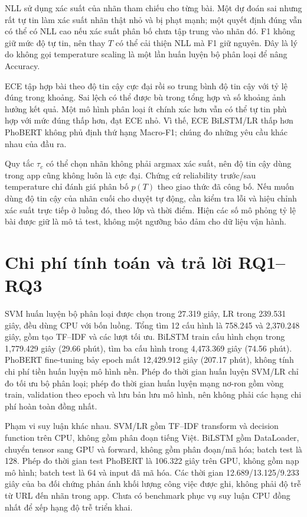 NLL sử dụng xác suất của nhãn tham chiếu cho từng bài. Một dự đoán sai nhưng rất tự tin làm xác suất nhãn thật nhỏ và bị phạt mạnh; một quyết định đúng vẫn có thể có NLL cao nếu xác suất phân bố chưa tập trung vào nhãn đó. F1 không giữ mức độ tự tin, nên thay $T$ có thể cải thiện NLL mà F1 giữ nguyên. Đây là lý do không gọi temperature scaling là một lần huấn luyện bộ phân loại để nâng Accuracy.

ECE tập hợp bài theo độ tin cậy cực đại rồi so trung bình độ tin cậy với tỷ lệ đúng trong khoảng. Sai lệch có thể được bù trong tổng hợp và số khoảng ảnh hưởng kết quả. Một mô hình phân loại ít chính xác hơn vẫn có thể tự tin phù hợp với mức đúng thấp hơn, đạt ECE nhỏ. Vì thế, ECE BiLSTM/LR thấp hơn PhoBERT không phủ định thứ hạng Macro-F1; chúng đo những yêu cầu khác nhau của đầu ra.

Quy tắc $\tau_c$ có thể chọn nhãn không phải argmax xác suất, nên độ tin cậy dùng trong app cũng không luôn là cực đại. Chứng cứ reliability trước/sau temperature chỉ đánh giá phân bố $p(T)$ theo giao thức đã công bố. Nếu muốn dùng độ tin cậy của nhãn cuối cho duyệt tự động, cần kiểm tra lỗi và hiệu chỉnh xác suất trực tiếp ở luồng đó, theo lớp và thời điểm. Hiện các số mô phỏng tỷ lệ bài được giữ là mô tả test, không một ngưỡng bảo đảm cho dữ liệu vận hành.

\FloatBarrier
\section{Chi phí tính toán và trả lời RQ1--RQ3}

SVM huấn luyện bộ phân loại được chọn trong 27.319 giây, LR trong 239.531 giây, đều dùng CPU với bốn luồng. Tổng tìm 12 cấu hình là 758.245 và 2,370.248 giây, gồm tạo TF--IDF và các lượt tối ưu. BiLSTM train cấu hình chọn trong 1,779.429 giây (29.66 phút), tìm ba cấu hình trong 4,473.369 giây (74.56 phút). PhoBERT fine-tuning bảy epoch mất 12,429.912 giây (207.17 phút), không tính chi phí tiền huấn luyện mô hình nền. Phép đo thời gian huấn luyện SVM/LR chỉ đo tối ưu bộ phân loại; phép đo thời gian huấn luyện mạng nơ-ron gồm vòng train, validation theo epoch và lưu bản lưu mô hình, nên không phải các hạng chi phí hoàn toàn đồng nhất.

Phạm vi suy luận khác nhau. SVM/LR gồm TF--IDF transform và decision function trên CPU, không gồm phân đoạn tiếng Việt. BiLSTM gồm DataLoader, chuyển tensor sang GPU và forward, không gồm phân đoạn/mã hóa; batch test là 128. Phép đo thời gian test PhoBERT là 106.322 giây trên GPU, không gồm nạp mô hình; batch test là 64 và input đã mã hóa. Các thời gian 12.689/13.125/9.233 giây của ba đối chứng phản ánh khối lượng công việc được ghi, không phải độ trễ từ URL đến nhãn trong app. Chưa có benchmark phục vụ suy luận CPU đồng nhất để xếp hạng độ trễ triển khai.

